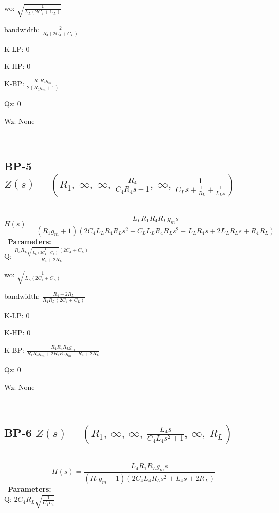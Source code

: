 \documentclass{article}
\begin{document}
wo: $\sqrt{\frac{1}{L_{L} \left(2 C_{4} + C_{L}\right)}}$\ 

bandwidth: $\frac{2}{R_{4} \left(2 C_{4} + C_{L}\right)}$\ 

K-LP: $0$\ 

K-HP: $0$\ 

K-BP: $\frac{R_{1} R_{4} g_{m}}{2 \left(R_{1} g_{m} + 1\right)}$\ 

Qz: $0$\ 

Wz: $\text{None}$\ 

\ 

\subsection{BP-5 $Z(s) = \left( R_{1}, \  \infty, \  \infty, \  \frac{R_{4}}{C_{4} R_{4} s + 1}, \  \infty, \  \frac{1}{C_{L} s + \frac{1}{R_{L}} + \frac{1}{L_{L} s}}\right)$ } \ 
\textbf{\[H(s) = \frac{L_{L} R_{1} R_{4} R_{L} g_{m} s}{\left(R_{1} g_{m} + 1\right) \left(2 C_{4} L_{L} R_{4} R_{L} s^{2} + C_{L} L_{L} R_{4} R_{L} s^{2} + L_{L} R_{4} s + 2 L_{L} R_{L} s + R_{4} R_{L}\right)}\] } \ 
\textbf{Parameters:}\\ 

Q: $\frac{R_{4} R_{L} \sqrt{\frac{1}{L_{L} \left(2 C_{4} + C_{L}\right)}} \left(2 C_{4} + C_{L}\right)}{R_{4} + 2 R_{L}}$\ 

wo: $\sqrt{\frac{1}{L_{L} \left(2 C_{4} + C_{L}\right)}}$\ 

bandwidth: $\frac{R_{4} + 2 R_{L}}{R_{4} R_{L} \left(2 C_{4} + C_{L}\right)}$\ 

K-LP: $0$\ 

K-HP: $0$\ 

K-BP: $\frac{R_{1} R_{4} R_{L} g_{m}}{R_{1} R_{4} g_{m} + 2 R_{1} R_{L} g_{m} + R_{4} + 2 R_{L}}$\ 

Qz: $0$\ 

Wz: $\text{None}$\ 

\ 

\subsection{BP-6 $Z(s) = \left( R_{1}, \  \infty, \  \infty, \  \frac{L_{4} s}{C_{4} L_{4} s^{2} + 1}, \  \infty, \  R_{L}\right)$ } \ 
\textbf{\[H(s) = \frac{L_{4} R_{1} R_{L} g_{m} s}{\left(R_{1} g_{m} + 1\right) \left(2 C_{4} L_{4} R_{L} s^{2} + L_{4} s + 2 R_{L}\right)}\] } \ 
\textbf{Parameters:}\\ 

Q: $2 C_{4} R_{L} \sqrt{\frac{1}{C_{4} L_{4}}}$\ 
\end{document}
